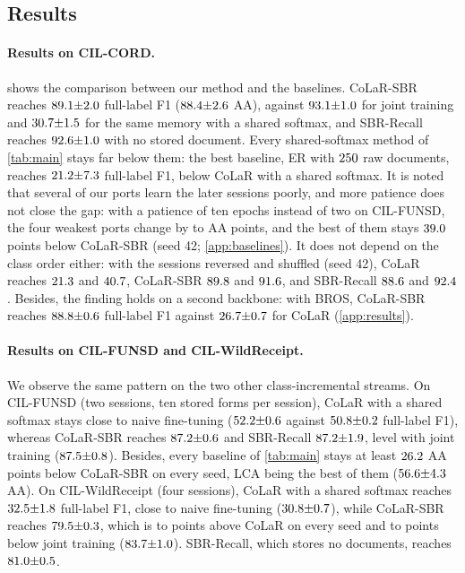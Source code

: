 \documentclass[10pt,twocolumn,letterpaper]{article}
\begin{document}
\subsection{Results}
\label{sec:beyond}
\paragraph{Results on CIL-CORD.}  shows the comparison between our method and the baselines. CoLaR-SBR reaches $89.1{\pm}2.0$ full-label F1 ($88.4{\pm}2.6$ AA), against $93.1{\pm}1.0$ for joint training and $30.7{\pm}1.5$ for the same memory with a shared softmax, and SBR-Recall reaches $92.6{\pm}1.0$ with no stored document. Every shared-softmax method of \cref{tab:main} stays far below them: the best baseline, ER with $250$ raw documents, reaches $21.2{\pm}7.3$ full-label F1, below CoLaR with a shared softmax. It is noted that several of our ports learn the later sessions poorly, and more patience does not close the gap: with a patience of ten epochs instead of two on CIL-FUNSD, the four weakest ports change by \nProbeDeltaMin{} to \nProbeDeltaMax{} AA points, and the best of them stays $39.0$ points below CoLaR-SBR (seed 42; \cref{app:baselines}). It does not depend on the class order either: with the sessions reversed and shuffled (seed 42), CoLaR reaches $21.3$ and $40.7$, CoLaR-SBR $89.8$ and $91.6$, and SBR-Recall $88.6$ and $92.4$. Besides, the finding holds on a second backbone: with BROS, CoLaR-SBR reaches $88.8{\pm}0.6$ full-label F1 against $26.7{\pm}0.7$ for CoLaR (\cref{app:results}).

\paragraph{Results on CIL-FUNSD and CIL-WildReceipt.} We observe the same pattern on the two other class-incremental streams. On CIL-FUNSD (two sessions, ten stored forms per session), CoLaR with a shared softmax stays close to naive fine-tuning ($52.2{\pm}0.6$ against $50.8{\pm}0.2$ full-label F1), whereas CoLaR-SBR reaches $87.2{\pm}0.6$ and SBR-Recall $87.2{\pm}1.9$, level with joint training ($87.5{\pm}0.8$). Besides, every baseline of \cref{tab:main} stays at least $26.2$ AA points below CoLaR-SBR on every seed, LCA being the best of them ($56.6{\pm}4.3$ AA). On CIL-WildReceipt (four sessions), CoLaR with a shared softmax reaches $32.5{\pm}1.8$ full-label F1, close to naive fine-tuning ($30.8{\pm}0.7$), while CoLaR-SBR reaches $79.5{\pm}0.3$, which is \nWildSbrMinusColarFullMin{} to \nWildSbrMinusColarFullMax{} points above CoLaR on every seed and \nWildJointMinusSbrFullMin{} to \nWildJointMinusSbrFullMax{} points below joint training ($83.7{\pm}1.0$). SBR-Recall, which stores no documents, reaches $81.0{\pm}0.5$.
\end{document}
